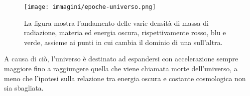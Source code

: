 \begin{figure}
    \centering
    \texttt{[image: immagini/epoche-universo.png]}
    \caption{La figura mostra l'andamento delle varie densità di massa di radiazione, materia ed energia oscura, rispettivamente rosso, blu e verde, assieme ai punti in cui cambia il dominio di una sull'altra.}\label{fig:epoche}
\end{figure}

A causa di ciò, l'universo è destinato ad espandersi con accelerazione sempre maggiore fino a raggiungere quella che viene chiamata morte dell'universo, a meno che l'ipotesi sulla relazione tra energia oscura e costante cosmologica non sia sbagliata.